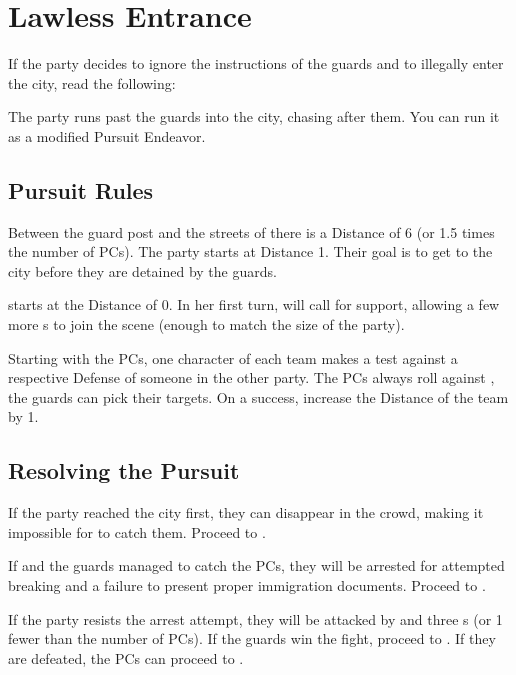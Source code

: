 \section{Lawless Entrance}
\label{sec:lawlessAct}

If the party decides to ignore the instructions of the guards and to illegally enter the city, read the following:


The party runs past the guards into the city, \npcHauka{} chasing after them. You can run it as a modified Pursuit Endeavor.



\subsection{Pursuit Rules}

Between the guard post and the streets of \locationYeddaw{} there is a Distance of 6 (or 1.5 times the number of PCs). The party starts at Distance 1. Their goal is to get to the city before they are detained by the guards.

\enemyGuardC{} starts at the Distance of 0. In her first turn, \npcHauka{} will call for support, allowing a few more \enemyGuardB{}s to join the scene (enough to match the size of the party).

Starting with the PCs, one character of each team makes a test against a respective Defense of someone in the other party. The PCs always roll against \enemyGuardC{}, the guards can pick their targets. On a success, increase the Distance of the team by 1.
 




\subsection{Resolving the Pursuit}

If the party reached the city first, they can disappear in the crowd, making it impossible for \npcHauka{} to catch them. Proceed to .

If \npcHauka{} and the guards managed to catch the PCs, they will be arrested for attempted breaking and a failure to present proper immigration documents. Proceed to .

If the party resists the arrest attempt, they will be attacked by \enemyGuardC{} and three \enemyGuardB{}s (or 1 fewer than the number of PCs). If the guards win the fight, proceed to . If they are defeated, the PCs can proceed to .




